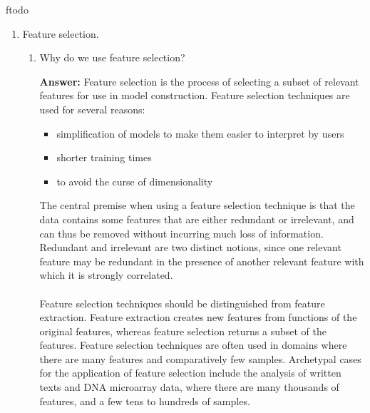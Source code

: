 ƒtodo\documentclass{article}
\newenvironment{QandA}{\begin{enumerate}[label=\arabic*.]}{\end{enumerate}}
\newenvironment{InnerQandA}{\begin{enumerate}[label=\roman*.]}{\end{enumerate}}
\newenvironment{answer}{\par\normalfont \textbf{Answer:}}{}
\begin{document}
\begin{QandA}
    \item Feature selection.
    \begin{InnerQandA}
        \item Why do we use feature selection?
        \begin{answer}
            Feature selection is the process of selecting a subset of relevant features for use in model construction. Feature selection techniques are used for several reasons:
            \begin{itemize}
                \item simplification of models to make them easier to interpret by users
                \item shorter training times
                \item to avoid the curse of dimensionality
            \end{itemize}
        The central premise when using a feature selection technique is that the data contains some features that are either redundant or irrelevant, and can thus be removed without incurring much loss of information. Redundant and irrelevant are two distinct notions, since one relevant feature may be redundant in the presence of another relevant feature with which it is strongly correlated.\\\\
        Feature selection techniques should be distinguished from feature extraction. Feature extraction creates new features from functions of the original features, whereas feature selection returns a subset of the features. Feature selection techniques are often used in domains where there are many features and comparatively few samples. Archetypal cases for the application of feature selection include the analysis of written texts and DNA microarray data, where there are many thousands of features, and a few tens to hundreds of samples.
        \end{answer}


\end{InnerQandA}
\end{QandA}
\end{document}
